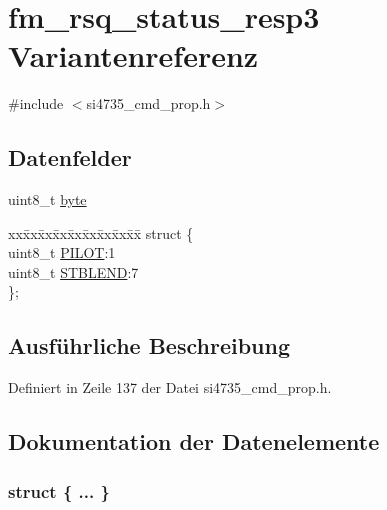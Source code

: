 \hypertarget{unionfm__rsq__status__resp3}{}\section{fm\+\_\+rsq\+\_\+status\+\_\+resp3 Variantenreferenz}
\label{unionfm__rsq__status__resp3}


{\ttfamily \#include $<$si4735\+\_\+cmd\+\_\+prop.\+h$>$}

\subsection*{Datenfelder}
\begin{DoxyCompactItemize}
\item 
uint8\+\_\+t \hyperlink{unionfm__rsq__status__resp3_a96f44d20f1dbf1c8785a7bc99a46164c}{byte}
\item 
\begin{tabbing}
xx\=xx\=xx\=xx\=xx\=xx\=xx\=xx\=xx\=\kill
struct \{\\
\>uint8\_t \hyperlink{unionfm__rsq__status__resp3_a4958d1df0f4dc7a3bf46c383663e0739}{PILOT}:1\\
\>uint8\_t \hyperlink{unionfm__rsq__status__resp3_ad02c06d90cc188a25eba06195f635624}{STBLEND}:7\\
\}; \\

\end{tabbing}\end{DoxyCompactItemize}


\subsection{Ausführliche Beschreibung}


Definiert in Zeile 137 der Datei si4735\+\_\+cmd\+\_\+prop.\+h.



\subsection{Dokumentation der Datenelemente}
\hypertarget{unionfm__rsq__status__resp3_a9e37b20f8937a72142de3b0950e97436}{}\subsubsection[{"@19}]{\setlength{\rightskip}{0pt plus 5cm}struct \{ ... \} }\label{unionfm__rsq__status__resp3_a9e37b20f8937a72142de3b0950e97436}
\hypertarget{unionfm__rsq__status__resp3_a96f44d20f1dbf1c8785a7bc99a46164c}{}
